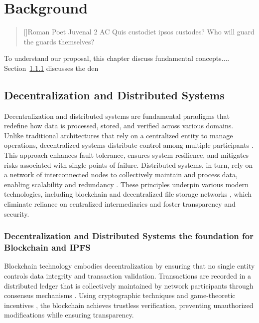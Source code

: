\documentclass[final]{rc-book-2.14}
\begin{document}
\chapter{Background}
\label{chp:review}

\begin{quotation}[]{Roman Poet Juvenal  2 AC}
    Quis custodiet ipsos custodes?  Who will guard the guards themselves?
\end{quotation}


\drop To understand our proposal, this chapter discuss fundamental concepts.... Section~\ref{} discusses the den


\newpage
\section{Decentralization and Distributed Systems}

Decentralization and distributed systems are fundamental paradigms that redefine how data is processed, stored, and verified across various domains. Unlike traditional architectures that rely on a centralized entity to manage operations, decentralized systems distribute control among multiple participants \cite{coulouris2011distributed}. This approach enhances fault tolerance, ensures system resilience, and mitigates risks associated with single points of failure. Distributed systems, in turn, rely on a network of interconnected nodes to collectively maintain and process data, enabling scalability and redundancy   \cite{lamport_1978, coulouris2011distributed}. These principles underpin various modern technologies, including blockchain \cite{nakamoto2008bitcoin} and decentralized file storage networks \cite{benet2014ipfs}, which eliminate reliance on centralized intermediaries and foster transparency and security.


\subsection{Decentralization and Distributed Systems the foundation for Blockchain and IPFS}

Blockchain technology embodies decentralization by ensuring that no single entity controls data integrity and transaction validation. Transactions are recorded in a distributed ledger that is collectively maintained by network participants through consensus mechanisms \cite{nakamoto2008bitcoin}. Using cryptographic techniques \cite{katz2020introduction} and game-theoretic incentives \cite{roughgarden2016twentyone}, the blockchain achieves trustless verification, preventing unauthorized modifications while ensuring transparency.
\end{document}
